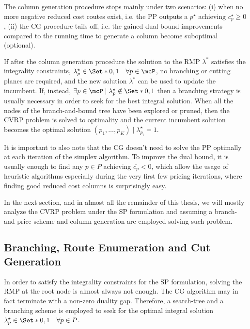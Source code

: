 The column generation procedure stops mainly under two scenarios:
(i) when no more negative reduced cost routes exist,
i.e. the PP outputs a $p^\star$ achieving $c^\star_p \ge 0$,
(ii) the CG procedure tails off,
i.e. the gained dual bound improvements
compared to the running time to generate a column
become suboptimal (optional).

If after the column generation procedure
the solution to the RMP $\lambda^*$ satisfies the integrality constraints,
$\lambda^\star_p \in \Set*{0, 1} \quad \forall p \in \mcP$,
no branching or cutting planes are required,
and the new solution $\lambda^*$ can be used to update the incumbent.
If, instead,
$\exists p \in \mcP \mid \lambda^\star_p \notin \Set*{0, 1}$
then a branching strategy is usually necessary
in order to seek for the best integral solution.
When all the nodes of the branch-and-bound tree have been explored or pruned,
then the CVRP problem is solved to optimality
and the current incumbent solution becomes the optimal solution
$(p_1, \dots, p_K) \mid \lambda^\star_{p_i} = 1$.

\medskip

It is important to also note that
the CG doesn't need to solve the PP optimally at each iteration of the simplex algorithm.
To improve the dual bound,
it is usually enough to find any $p \in P$ achieving $\bar{c_p} < 0$,
which allow the usage of heuristic algorithms
especially during the very first few pricing iterations,
where finding good reduced cost columns is surprisingly easy.

\medskip

In the next section, and in almost all the remainder of this thesis,
we will mostly analyze the CVRP problem under the SP formulation
and assuming a branch-and-price scheme and column generation
are employed solving such problem.

\subsection{Branching, Route Enumeration and Cut Generation}
\label{sec:intro-branching-and-cut-generation-within-bap-frameworks}

In order to satisfy the integrality constraints for the SP formulation,
solving the RMP at the root node is almost always not enough.
The CG algorithm may in fact terminate with a non-zero duality gap.
Therefore,
a search-tree and a branching scheme is employed
to seek for the optimal integral solution $\lambda^\star_p \in \Set*{0, 1} \quad \forall p \in P$.

